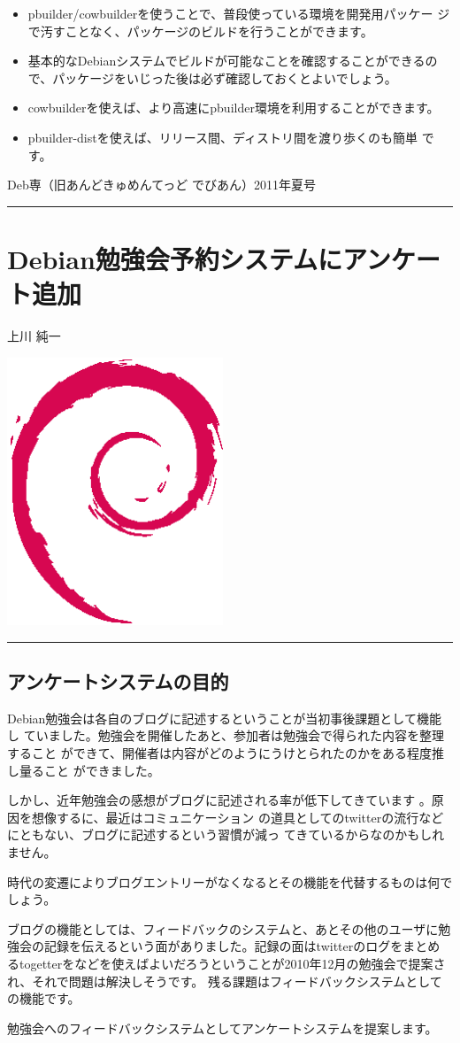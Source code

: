 \documentclass[mingoth,a4paper]{jsarticle}
\renewcommand{\dancersection}[2]{%
\newpage
Deb専（旧あんどきゅめんてっど でびあん）2011年夏号
%
\vspace{0.1mm}\\
{\color{dancerdarkblue}\rule{\hsize}{2mm}}

%
%
\begin{minipage}[t]{0.6\hsize}
\color{dancerdarkblue}
\vspace{1cm}
\section{#1}
\hfill{}#2\\
\end{minipage}
\begin{minipage}[t]{0.4\hsize}
\vspace{-2cm}
\hfill{}\includegraphics[height=8cm]{image200502/openlogo-nd.eps}\\
\vspace{-5cm}
\end{minipage}
%
{\color{dancerlightblue}\rule{0.66\hsize}{2mm}}
%
\vspace{2cm}
}
\begin{document}
\begin{itemize}
 \item pbuilder/cowbuilderを使うことで、普段使っている環境を開発用パッケー
       ジで汚すことなく、パッケージのビルドを行うことができます。

 \item 基本的なDebianシステムでビルドが可能なことを確認することができるの
       で、パッケージをいじった後は必ず確認しておくとよいでしょう。

 \item cowbuilderを使えば、より高速にpbuilder環境を利用することができます。

 \item pbuilder-distを使えば、リリース間、ディストリ間を渡り歩くのも簡単
       です。

\end{itemize}

\dancersection{Debian勉強会予約システムにアンケート追加}{上川 純一}

\subsection{アンケートシステムの目的}

Debian勉強会は各自のブログに記述するということが当初事後課題として機能し
ていました。勉強会を開催したあと、参加者は勉強会で得られた内容を整理すること
ができて、開催者は内容がどのようにうけとられたのかをある程度推し量ること
ができました。

しかし、近年勉強会の感想がブログに記述される率が低下してきています
\cite{deb201012annualreport}。原因を想像するに、最近はコミュニケーション
の道具としてのtwitterの流行などにともない、ブログに記述するという習慣が減っ
てきているからなのかもしれません。

時代の変遷によりブログエントリーがなくなるとその機能を代替するものは何で
しょう。

ブログの機能としては、フィードバックのシステムと、あとその他のユーザに勉
強会の記録を伝えるという面がありました。記録の面はtwitterのログをまとめ
るtogetterをなどを使えばよいだろうということが2010年12月の勉強会で提案さ
れ、それで問題は解決しそうです。
残る課題はフィードバックシステムとしての機能です。

勉強会へのフィードバックシステムとしてアンケートシステムを提案します。
\end{document}
